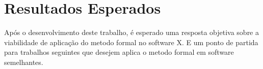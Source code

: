 \section{Resultados Esperados}
Após o desenvolvimento deste trabalho, é esperado uma resposta objetiva sobre a viabilidade de aplicação do metodo formal no software X.
E um ponto de partida para trabalhos seguintes que desejem aplica o metodo formal em software semelhantes.